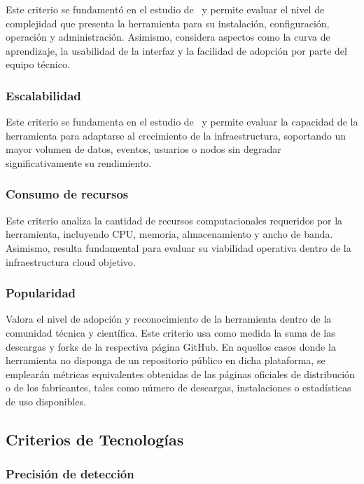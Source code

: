Este criterio se fundamentó en el estudio de~\cite{hadi2024opensource} y permite evaluar el nivel de complejidad que presenta la 
herramienta para su instalación, configuración, operación y administración. Asimismo, considera aspectos como la curva de aprendizaje, la 
usabilidad de la interfaz y la facilidad de adopción por parte del equipo técnico.

\subsubsection{Escalabilidad}

Este criterio se fundamenta en el estudio de~\cite{hadi2024opensource} y permite evaluar la capacidad de la herramienta para adaptarse al 
crecimiento de la infraestructura, soportando un mayor volumen de datos, eventos, usuarios o nodos sin degradar significativamente su 
rendimiento.

\subsubsection{Consumo de recursos}

Este criterio analiza la cantidad de recursos computacionales requeridos por la herramienta, incluyendo CPU, memoria, almacenamiento y 
ancho de banda. Asimismo, resulta fundamental para evaluar su viabilidad operativa dentro de la infraestructura cloud objetivo.

\subsubsection{Popularidad}

Valora el nivel de adopción y reconocimiento de la herramienta dentro de la comunidad técnica y científica. Este criterio usa como medida 
la suma de las descargas y forks de la respectiva página GitHub. En aquellos casos donde la herramienta no disponga de un repositorio 
público en dicha plataforma, se emplearán métricas equivalentes obtenidas de las páginas oficiales de distribución o de los fabricantes, 
tales como número de descargas, instalaciones o estadísticas de uso disponibles.

\subsection{Criterios de Tecnologías \IDPS}

\subsubsection{Precisión de detección}

